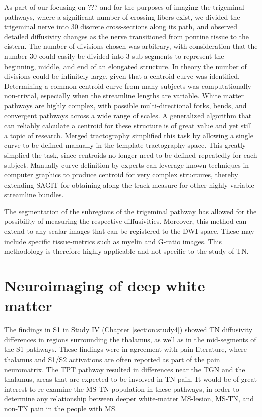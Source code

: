 As part of our focusing on ??? and for the purposes of imaging the trigeminal pathways, where a significant number of crossing fibers exist, we divided the trigeminal nerve into 30 discrete cross-sections along its path, and observed detailed diffusivity changes as the nerve transitioned from pontine tissue to the cistern. The number of divisions chosen was arbitrary, with consideration that the number 30 could easily be divided into 3 sub-segments to represent the beginning, middle, and end of an elongated structure. In theory the number of divisions could be infinitely large, given that a centroid curve was identified. Determining a common centroid curve from many subjects was computationally non-trivial, especially when the streamline lengths are variable. White matter pathways are highly complex, with possible multi-directional forks, bends, and convergent pathways across a wide range of scales. A generalized algorithm that can reliably calculate a centroid for these structure is of great value and yet still a topic of research. 
Merged tractography  simplified this task by allowing a single curve to be defined manually in the template tractography space. This greatly simplied the task, since centroids no longer need to be defined repeatedly for each subject. Manually curve definition by experts can leverage known techniques in computer graphics to produce centroid for very complex structures, thereby extending SAGIT for obtaining along-the-track measure for other highly variable streamline bundles.

The segmentation of the subregions of the trigeminal pathway has allowed for the possibility of measuring the respective diffusivities. Moreover, this method can extend to any scalar images that can be registered to the DWI space. These may include specific tissue-metrics such as myelin and G-ratio images. This methodology is therefore highly applicable and not specific to the study of TN.


\section{Neuroimaging of deep white matter}

The findings in S1 in Study IV (Chapter \ref{section:study4}) showed TN diffusivity differences in regions surrounding the thalamus, as well as in the mid-segments of the S1 pathways. These findings were in agreement with pain literature, where thalamus and S1/S2 activations are often reported as part of the pain neuromatrix. The TPT pathway resulted in differences near the TGN and the thalamus, areas that are expected to be involved in TN pain. It would be of great interest to re-examine the MS-TN population in these pathways, in order to determine any relationship between deeper white-matter MS-lesion, MS-TN, and non-TN pain in the people with MS.

